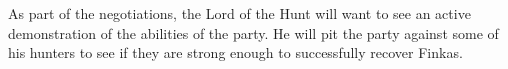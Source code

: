 As part of the negotiations, the Lord of the Hunt will want to see an active demonstration of the abilities of the party.
He will pit the party against some of his hunters to see if they are strong enough to successfully recover Finkas.

